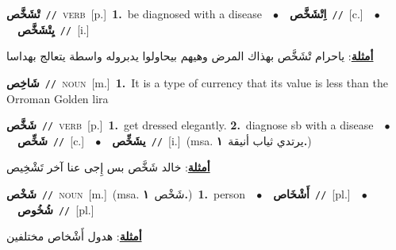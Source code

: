 \documentclass[10pt,a4paper,twoside]{article} %
\begin{document}
\begin{multicols}{2}
{\setlength\topsep{0pt}\textbf{\foreignlanguage{arabic}{تْشَخَّص}}\ {\color{gray}\texttt{//}\color{black}}\ \textsc{verb}\ [p.]\ \textbf{1.}~be diagnosed with a disease\ \ $\bullet$\ \ \setlength\topsep{0pt}\textbf{\foreignlanguage{arabic}{اِتْشَخَّص}}\ {\color{gray}\texttt{//}\color{black}}\ [c.]\ \ $\bullet$\ \ \setlength\topsep{0pt}\textbf{\foreignlanguage{arabic}{يِتْشَخَّص}}\ {\color{gray}\texttt{//}\color{black}}\ [i.]\  \begin{flushright}\color{gray}\foreignlanguage{arabic}{\textbf{\underline{\foreignlanguage{arabic}{أمثلة}}}: ياحرام تْشَخَّص بهذاك المرض وهيهم بيحاولوا يدبروله واسطة يتعالج بهداسا}\end{flushright}\color{black}} \vspace{2mm}

{\setlength\topsep{0pt}\textbf{\foreignlanguage{arabic}{شَاخِص}}\ {\color{gray}\texttt{//}\color{black}}\ \textsc{noun}\ [m.]\ \textbf{1.}~It is a type of currency that its value is less than the Orroman Golden lira\ } \vspace{2mm}

{\setlength\topsep{0pt}\textbf{\foreignlanguage{arabic}{شَخَّص}}\ {\color{gray}\texttt{//}\color{black}}\ \textsc{verb}\ [p.]\ \textbf{1.}~get dressed elegantly.  \textbf{2.}~diagnose sb with a disease\ \ $\bullet$\ \ \setlength\topsep{0pt}\textbf{\foreignlanguage{arabic}{شَخِّص}}\ {\color{gray}\texttt{//}\color{black}}\ [c.]\ \ $\bullet$\ \ \setlength\topsep{0pt}\textbf{\foreignlanguage{arabic}{يشَخِّص}}\ {\color{gray}\texttt{//}\color{black}}\ [i.]\ \color{gray}(msa. \foreignlanguage{arabic}{يرتدي ثياب أنيقة}~\foreignlanguage{arabic}{\textbf{١.}})\color{black}\  \begin{flushright}\color{gray}\foreignlanguage{arabic}{\textbf{\underline{\foreignlanguage{arabic}{أمثلة}}}: خالد شَخَّص بس إِجى عنا آخر تَشْخِيص}\end{flushright}\color{black}} \vspace{2mm}

{\setlength\topsep{0pt}\textbf{\foreignlanguage{arabic}{شَخْص}}\ {\color{gray}\texttt{//}\color{black}}\ \textsc{noun}\ [m.]\ \color{gray}(msa. \foreignlanguage{arabic}{شَخْص}~\foreignlanguage{arabic}{\textbf{١.}})\color{black}\ \textbf{1.}~person\ \ $\bullet$\ \ \setlength\topsep{0pt}\textbf{\foreignlanguage{arabic}{أَشْخَاص}}\ {\color{gray}\texttt{//}\color{black}}\ [pl.]\ \ $\bullet$\ \ \setlength\topsep{0pt}\textbf{\foreignlanguage{arabic}{شُخُوص}}\ {\color{gray}\texttt{//}\color{black}}\ [pl.]\  \begin{flushright}\color{gray}\foreignlanguage{arabic}{\textbf{\underline{\foreignlanguage{arabic}{أمثلة}}}: هدول أَشْخاص مختلفين}\end{flushright}\color{black}} \vspace{2mm}


\end{multicols}
\end{document}
